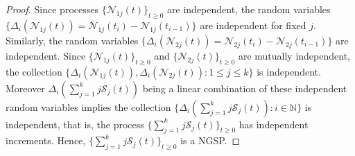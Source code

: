 \documentclass[11pt,oneside,reqno]{amsart}
\theoremstyle{definition}
\theoremstyle{remarkstyle}
\begin{document}
\begin{proof}
Since processes $\{\mathcal{N}_{1j}(t)\}_{t\ge 0}$ are independent, the random variables $\{\Delta_i(\mathcal{N}_{1j}(t))=\mathcal{N}_{1j}(t_i)-\mathcal{N}_{1j}(t_{i-1})\}$ are independent for fixed $j$. Similarly, the random variables $\{\Delta_i(\mathcal{N}_{2j}(t))=\mathcal{N}_{2j}(t_i)-\mathcal{N}_{2j}(t_{i-1})\}$ are independent. Since $\{\mathcal{N}_{1j}(t)\}_{t\ge 0}$ and $\{\mathcal{N}_{2j}(t)\}_{t\ge 0}$ are mutually independent, the collection $\{\Delta_i(\mathcal{N}_{1j}(t)),\Delta_i(\mathcal{N}_{2j}(t)):1\le j\le k\}$ is independent. Moreover $\Delta_i\left(\sum_{j=1}^{k}j\mathcal{S}_j(t)\right)$ being a linear combination of these independent random variables implies the collection $\{\Delta_i(\sum_{j=1}^{k}j\mathcal{S}_j(t)):i\in\mathbb{N}\}$ is independent, that is, the process $\{\sum_{j=1}^{k}j\mathcal{S}_j(t)\}_{t\ge0}$ has independent increments.
 Hence, $\{\sum_{j=1}^{k}j\mathcal{S}_j(t)\}_{t\ge0}$ is a NGSP.
\end{proof}
\end{document}
